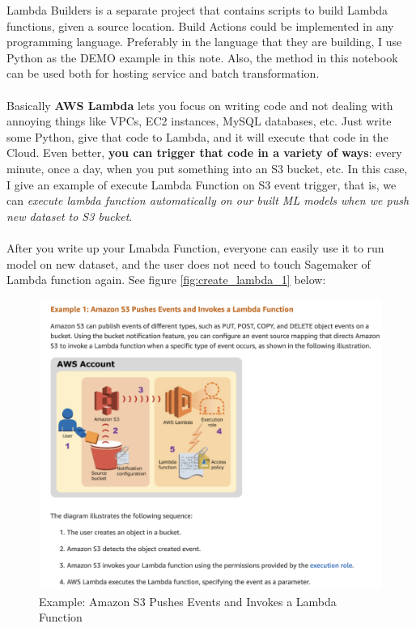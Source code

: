 \documentclass[12pt]{article}
\begin{document}
Lambda Builders is a separate project that contains scripts to build Lambda functions, given a source location. Build Actions could be implemented in any programming language. Preferably in the language that they are building, I use Python as the DEMO example in this note. Also, the method in this notebook can be used both for hosting service and batch transformation.
\\
\\
\noindent
Basically \textbf{AWS Lambda} lets you focus on writing code and not dealing with annoying things like VPCs, EC2 instances, MySQL databases, etc. Just write some Python, give that code to Lambda, and it will execute that code in the Cloud. Even better, \textbf{you can trigger that code in a variety of ways}: every minute, once a day, when you put something into an S3 bucket, etc. In this case, I give an example of execute Lambda Function on S3 event trigger, that is, we can \textit{execute lambda function automatically on our built ML models when we push new dataset to S3 bucket}.
\\
\\
\noindent
After you write up your Lmabda Function, everyone can easily use it to run model on new dataset, and the user does not need to touch Sagemaker of Lambda function again. See figure \ref{fig:create_lambda_1} below:
\begin{figure}[H]
\centering
\begin{minipage}{1\textwidth}
  \centering
  \includegraphics[width=1\linewidth]{TriggerS3Example.png}
   \caption{Example: Amazon S3 Pushes Events and Invokes a Lambda Function}
   \label{fig:TriggerS3Example}
\end{minipage}%
\end{figure}
\noindent
\end{document}
